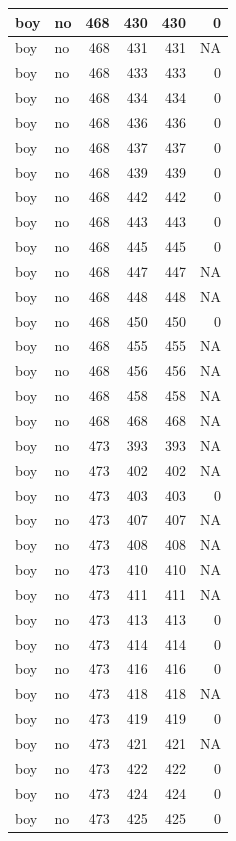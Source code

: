 \documentclass[man]{apa6}
\begin{document}
\begin{tabular}{l|l|r|r|r|r}
\hline
boy & no & 468 & 430 & 430 & 0\\
\hline
boy & no & 468 & 431 & 431 & NA\\
\hline
boy & no & 468 & 433 & 433 & 0\\
\hline
boy & no & 468 & 434 & 434 & 0\\
\hline
boy & no & 468 & 436 & 436 & 0\\
\hline
boy & no & 468 & 437 & 437 & 0\\
\hline
boy & no & 468 & 439 & 439 & 0\\
\hline
boy & no & 468 & 442 & 442 & 0\\
\hline
boy & no & 468 & 443 & 443 & 0\\
\hline
boy & no & 468 & 445 & 445 & 0\\
\hline
boy & no & 468 & 447 & 447 & NA\\
\hline
boy & no & 468 & 448 & 448 & NA\\
\hline
boy & no & 468 & 450 & 450 & 0\\
\hline
boy & no & 468 & 455 & 455 & NA\\
\hline
boy & no & 468 & 456 & 456 & NA\\
\hline
boy & no & 468 & 458 & 458 & NA\\
\hline
boy & no & 468 & 468 & 468 & NA\\
\hline
boy & no & 473 & 393 & 393 & NA\\
\hline
boy & no & 473 & 402 & 402 & NA\\
\hline
boy & no & 473 & 403 & 403 & 0\\
\hline
boy & no & 473 & 407 & 407 & NA\\
\hline
boy & no & 473 & 408 & 408 & NA\\
\hline
boy & no & 473 & 410 & 410 & NA\\
\hline
boy & no & 473 & 411 & 411 & NA\\
\hline
boy & no & 473 & 413 & 413 & 0\\
\hline
boy & no & 473 & 414 & 414 & 0\\
\hline
boy & no & 473 & 416 & 416 & 0\\
\hline
boy & no & 473 & 418 & 418 & NA\\
\hline
boy & no & 473 & 419 & 419 & 0\\
\hline
boy & no & 473 & 421 & 421 & NA\\
\hline
boy & no & 473 & 422 & 422 & 0\\
\hline
boy & no & 473 & 424 & 424 & 0\\
\hline
boy & no & 473 & 425 & 425 & 0\\

\end{tabular}
\end{document}
